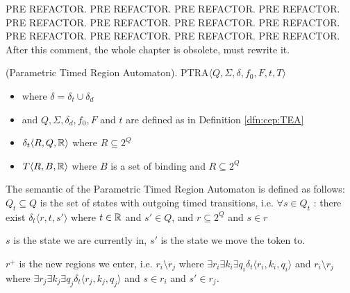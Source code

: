 			
		
		PRE REFACTOR. PRE REFACTOR. PRE REFACTOR. PRE REFACTOR. PRE REFACTOR. PRE REFACTOR. PRE REFACTOR. PRE REFACTOR. PRE REFACTOR. PRE REFACTOR. PRE REFACTOR. PRE REFACTOR. 
		After this comment, the whole chapter is obsolete, must rewrite it.
	
				
			\begin{dfn}
				(Parametric Timed Region Automaton).
				PTRA$\langle Q, \Sigma, \delta, f_0, F, t, T \rangle$
				\begin{itemize}
					\item where $\delta = \delta_t \cup \delta_d$
					\item and $Q, \Sigma, \delta_d, f_0, F$ and $t$ are defined as in Definition \ref{dfn:cep:TEA}
					\item $\delta_t \langle R, Q, \mathbb{R} \rangle $ where $R \subseteq 2^Q$
					\item $T\langle R, B, \mathbb{R} \rangle$ where $B$ is a set of binding and  $R \subseteq 2^Q$

				\end{itemize}
				
			\end{dfn}
			
			The semantic of the Parametric Timed Region Automaton is defined as follows:
			$Q_t \subseteq Q$ is the set of states with outgoing timed transitions, i.e. $\forall s \in Q_t$ : there exist $ \delta_t\langle r, t, s' \rangle$ where $t \in \mathbb{R}$ and $s' \in Q$, and $r \subseteq 2^Q$ and $s \in r$
			
			$s$ is the state we are currently in, $s'$ is the state we move the token to.
			
			$r^+$ is the new regions we enter, i.e. $ r_i \setminus r_j $ where $ \exists r_i \exists k_i \exists q_i \delta_t\langle r_i,k_i,q_i \rangle$ and $ r_i \setminus r_j $ where $ \exists r_j \exists k_j \exists q_j \delta_t\langle r_j,k_j,q_j \rangle$ and $ s \in r_i$ and $s' \in r_j$.
			
